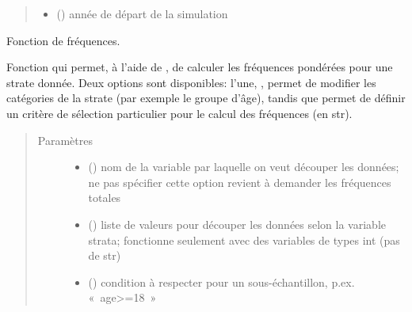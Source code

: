\documentclass[letterpaper,10pt,french]{sphinxmanual}
\begin{document}
\begin{fulllineitems}
\begin{fulllineitems}
\begin{quote}
\begin{description}
\begin{itemize}
\item {} 
 () \textendash{} année de départ de la simulation

\end{itemize}

\end{description}\end{quote}

\end{fulllineitems}


\begin{fulllineitems}
\label{\detokenize{code:simgen.statistics.freq}}
Fonction de fréquences.

Fonction qui permet, à l’aide de , de calculer les fréquences pondérées pour une strate donnée. Deux options sont disponibles: l’une, , permet de modifier les catégories de la strate (par exemple le groupe d’âge), tandis que  permet de définir un critère de sélection particulier pour le calcul des fréquences (en str).
\begin{quote}\begin{description}
\item[{Paramètres}] \leavevmode\begin{itemize}
\item {} 
 () \textendash{} nom de la variable par laquelle on veut découper les données; ne pas spécifier cette option revient à demander les fréquences totales

\item {} 
 () \textendash{} liste de valeurs pour découper les données selon la variable strata; fonctionne seulement avec des variables de types int (pas de str)

\item {} 
 () \textendash{} condition à respecter pour un sous-échantillon, p.ex. « age\textgreater{}=18 »


\end{itemize}
\end{description}
\end{quote}
\end{fulllineitems}
\end{fulllineitems}
\end{document}
